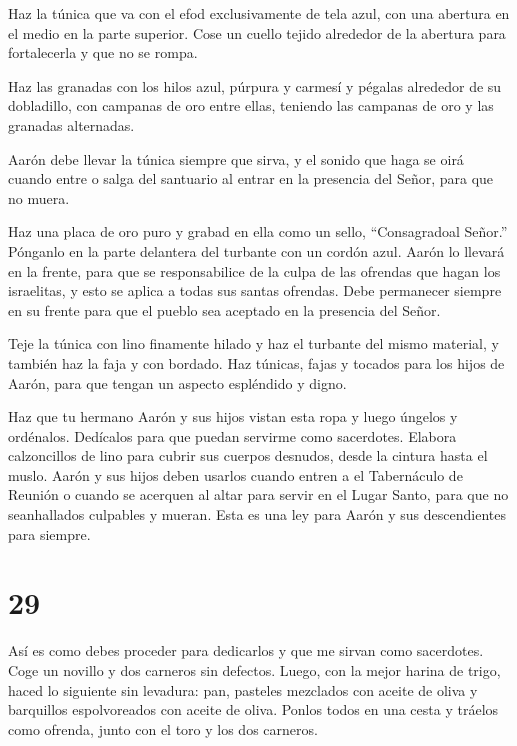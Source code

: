  Haz la túnica que va con el efod exclusivamente de tela
azul,  con una abertura en el medio en la parte superior.
Cose un cuello tejido alrededor de la abertura para fortalecerla y que
no se rompa.

 Haz las granadas con los hilos azul, púrpura y carmesí y
pégalas alrededor de su dobladillo, con campanas de oro entre ellas,
 teniendo las campanas de oro y las granadas alternadas.

 Aarón debe llevar la túnica siempre que sirva, y el sonido
que haga se oirá cuando entre o salga del santuario al entrar en la
presencia del Señor, para que no muera.

 Haz una placa de oro puro y grabad en ella como un sello,
``Consagradoal Señor.''  Pónganlo en la parte delantera del
turbante con un cordón azul.  Aarón lo llevará en la
frente, para que se responsabilice de la culpa de las ofrendas que hagan
los israelitas, y esto se aplica a todas sus santas ofrendas. Debe
permanecer siempre en su frente para que el pueblo sea aceptado en la
presencia del Señor.

 Teje la túnica con lino finamente hilado y haz el turbante
del mismo material, y también haz la faja y con bordado. 
Haz túnicas, fajas y tocados para los hijos de Aarón, para que tengan un
aspecto espléndido y digno.

 Haz que tu hermano Aarón y sus hijos vistan esta ropa y
luego úngelos y ordénalos. Dedícalos para que puedan servirme como
sacerdotes.  Elabora calzoncillos de lino para cubrir sus
cuerpos desnudos, desde la cintura hasta el muslo.  Aarón y
sus hijos deben usarlos cuando entren a el Tabernáculo de Reunión o
cuando se acerquen al altar para servir en el Lugar Santo, para que no
seanhallados culpables y mueran. Esta es una ley para Aarón y sus
descendientes para siempre.

\hypertarget{section-28}{%
\section{29}\label{section-28}}

 Así es como debes proceder para dedicarlos y que me sirvan
como sacerdotes. Coge un novillo y dos carneros sin defectos.
 Luego, con la mejor harina de trigo, haced lo siguiente sin
levadura: pan, pasteles mezclados con aceite de oliva y barquillos
espolvoreados con aceite de oliva.  Ponlos todos en una
cesta y tráelos como ofrenda, junto con el toro y los dos carneros.

